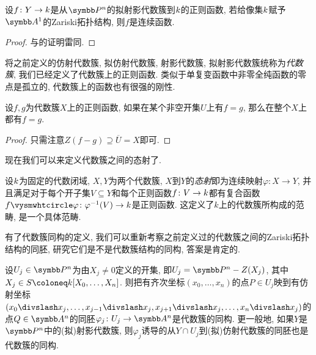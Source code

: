 \begin{proposition}\label{prop:projregularcontinuous}
  设$f\colon Y\to k$是从$\PP^n$的拟射影代数簇到$k$的正则函数, 若给像集$k$赋予$\AF^1$的Zariski拓扑结构, 则$f$是连续函数.
\end{proposition}

\begin{proof}
  与的证明雷同.
\end{proof}

将之前定义的仿射代数簇, 拟仿射代数簇, 射影代数簇, 拟射影代数簇统称为\emph{代数簇}, 我们已经定义了代数簇上的正则函数. 类似于单复变函数中非零全纯函数的零点是孤立的\parencite[127]{ahlfors_complex_1978}, 代数簇上的函数也有很强的刚性.

\begin{proposition}\label{prop:regularstiffness}
  设$f, g$为代数簇$X$上的正则函数, 如果在某个非空开集$U$上有$f=g$, 那么在整个$X$上都有$f=g$.
\end{proposition}

\begin{proof}
  只需注意$Z(f-g)\supseteq \overline{U}=X$即可.
\end{proof}

现在我们可以来定义代数簇之间的态射了.

\begin{definition}
  设$k$为固定的代数闭域, $X, Y$为两个代数簇, $X$到$Y$的\emph{态射}即为连续映射$\varphi\colon X\to Y$, 并且满足对于每个开子集$V\subseteq Y$和每个正则函数$f\colon V\to k$都有复合函数$f\composite\varphi\colon\varphi^{-1}(V)\to \kk$是正则函数. 这定义了$k$上的代数簇所构成的范畴, 是一个具体范畴.
\end{definition}

有了代数簇同构的定义, 我们可以重新考察之前定义过的代数簇之间的Zariski拓扑结构的同胚, 研究它们是不是代数簇结构的同构, 答案是肯定的.

\begin{proposition}\label{prop:projectiveopencoverisomorphism}
  设$U_j\in \PP^n$为由$X_j\neq 0$定义的开集, 即$U_j=\PP^n - Z(X_j)$, 其中$X_j\in S\coloneq \kk [X_0, \dotsc, X_n]$. 则把有齐次坐标$(x_0, \dotsc, x_n)$的点$P\in U_j$映到有仿射坐标$(x_0{\divslash}x_j,\linebreak[0] \dotsc, x_{j-1}{\divslash}x_j,\linebreak[0] x_{j+1}{\divslash}x_j, \dotsc,  x_n{\divslash}x_j)$的点$Q\in \AF^n$的同胚$\varphi_j\colon U_j\to \AF^n$是代数簇的同构. 更一般地, 如果$Y$是$\PP^n$中的(拟)射影代数簇, 则$\varphi_j$诱导的从$Y\cap U_j$到(拟)仿射代数簇的同胚也是代数簇的同构.
\end{proposition}

